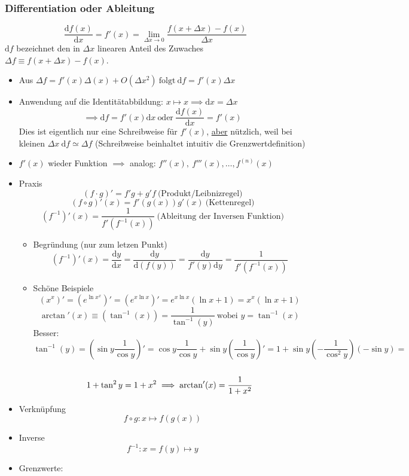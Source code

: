 \documentclass[a4paper]{scrartcl}
\theoremstyle{definition}
\theoremstyle{plain}
\theoremstyle{remark}
\theoremstyle{remark}
\begin{document}
\subsubsection{Differentiation oder Ableitung}
\label{sec-2-2-2}
\[\frac{\mathrm{d}f(x)}{\mathrm{d}x} = f'(x) = \lim_{\Delta x \to 0} \frac{f(x + \Delta x) - f(x)}{\Delta x}\]
$\mathrm{d}f$ bezeichnet den in $\Delta x$ linearen Anteil des Zuwaches $\Delta f\equiv f(x + \Delta x) - f(x)$.
\begin{itemize}
\item Aus $\Delta f = f'(x)\Delta(x) + O(\Delta x^2)~\text{folgt}~\mathrm{d}f = f'(x)\Delta x$
\item Anwendung auf die Identitätabbildung: $x \mapsto x \implies \mathrm{d}x = \Delta x$
      \[\implies \mathrm{d}f = f'(x)\mathrm{d}x~\text{oder}~\frac{\mathrm{d}f(x)}{\mathrm{d}x} = f'(x)\]
      Dies ist eigentlich nur eine Schreibweise für $f'(x)$, \uline{aber} nützlich, weil bei kleinen $\Delta x~\mathrm{d}f \simeq \Delta f$ (Schreibweise beinhaltet intuitiv die Grenzwertdefinition)
\item $f'(x)$ wieder Funktion $\implies$ analog: $f''(x),~f'''(x),\ldots,f^{(n)}(x)$
\item Praxis
\[(f\cdot g)' = f' g + g' f~\text{(Produkt/Leibnizregel)}\]
\[(f \circ g)'(x) = f'(g(x))g'(x)~\text{(Kettenregel)}\]
\[(f^{-1})'(x) = \frac{1}{f'(f^{-1}(x))}~\text{(Ableitung der Inversen Funktion)}\]
\begin{itemize}
\item Begründung (nur zum letzen Punkt)
\[(f^{-1})'(x) = \frac{\mathrm{d}y}{\mathrm{d}x} = \frac{\mathrm{d}y}{\mathrm{d}(f(y))} = \frac{\mathrm{d}y}{f'(y)\mathrm{d}y} = \frac{1}{f'(f^{-1}(x))}\]
\item Schöne Beispiele
\[(x^x)' = (e^{\ln{x^x}})' = (e^{x\ln{x}})' = e^{x\ln{x}}(\ln{x} + 1) = x^x(\ln{x} + 1)\]
\[\arctan'(x) \equiv (\tan^{-1}(x)) = \frac{1}{\tan^{-1}(y)}~\text{wobei $y = \tan^{-1}(x)$}\]
Besser: \[\tan^{-1}(y) = (\sin{y} \frac{1}{\cos{y}})' = \cos{y} \frac{1}{\cos{y}} + \sin{y}(\frac{1}{\cos{y}})' = 1 + \sin{y}(-\frac{1}{\cos^2{y}})(-\sin{y}) = \] \\
        \[ 1 + \tan^2{y} = 1 + x^2 \\ \implies \arctan'(x) = \frac{1}{1 + x^2}\]
\end{itemize}
\item Verknüpfung \[f\circ g: x\mapsto f(g(x))\]
\item Inverse \[f^{-1} : x=f(y)\mapsto y\]
\item Grenzwerte:

\end{itemize}
\end{document}
